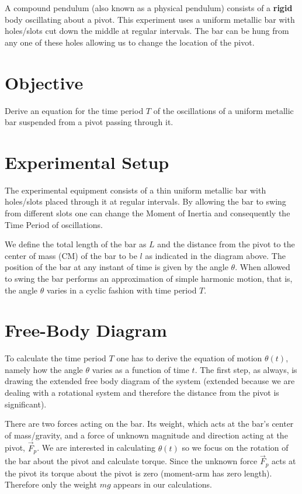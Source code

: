 
A compound pendulum (also known as a physical pendulum) consists of a \textbf{rigid} body oscillating about a pivot. This experiment uses a uniform metallic bar with holes/slots cut down the middle at regular intervals. The bar can be hung from any one of these holes allowing us to change the location of the pivot.

\section{Objective}

Derive an equation for the time period $T$ of the oscillations of a uniform metallic bar suspended from a pivot passing through it.

\section{Experimental Setup}

   The experimental equipment consists of a thin uniform metallic bar with holes/slots placed through it at regular intervals. By allowing the bar to swing from different slots one can change the Moment of Inertia and consequently the Time Period of oscillations.

   \begin{center}
   \end{center}

   We define the total length of the bar as $L$ and the distance from the pivot to the center of mass (CM) of the bar to be $l$ as indicated in the diagram above. The position of the bar at any instant of time is given by the angle $\theta$. When allowed to swing the bar performs an approximation of simple harmonic motion, that is, the angle $\theta$ varies in a cyclic fashion with time period $T$.

\section{Free-Body Diagram}

   To calculate the time period $T$ one has to derive the equation of motion $\theta(t)$, namely how the angle $\theta$ varies as a function of time $t$. The first step, as always, is drawing the extended free body diagram of the system (extended because we are dealing with a rotational system and therefore the distance from the pivot is significant).

   \begin{center}
      
   \end{center}

   There are two forces acting on the bar. Its weight, which acts at the bar's center of mass/gravity, and a force of unknown magnitude and direction acting at the pivot, $\vec{F}_p$. We are interested in calculating $\theta(t)$ so we focus on the rotation of the bar about the pivot and calculate torque. Since the unknown force $\vec{F}_p$ acts at the pivot its torque about the pivot is zero (moment-arm has zero length). Therefore only the weight $m g$ appears in our calculations.

